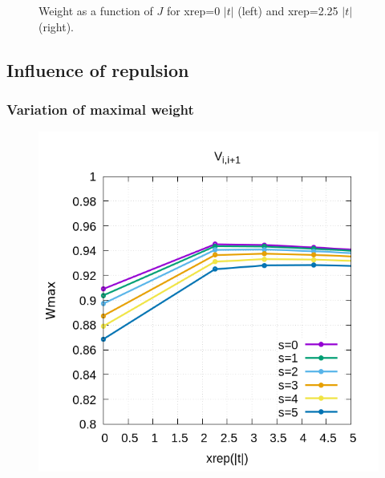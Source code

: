 \documentclass[12pt,twoside]{report}
\begin{document}
\begin{figure}[h!]
\begin{minipage}{0.4\textwidth}
		\end{minipage}
		\caption{\label{fig:} Weight as a function of $J$ for xrep=0 $|t|$ (left) and xrep=2.25 $|t|$ (right). }
	\end{figure}
	
	
	
	\subsection{Influence of repulsion}
	\subsubsection{Variation of maximal weight}
	\begin{figure}[h!]
		\centering
		\hspace{-2cm}
		\begin{minipage}{0.4\textwidth}
			\includegraphics[scale=0.4]{Wmax_vs_xrep0v1.png}
		\end{minipage}
		\hspace{2cm}
		\begin{minipage}{0.4\textwidth}

\end{minipage}
\end{figure}
\end{document}
